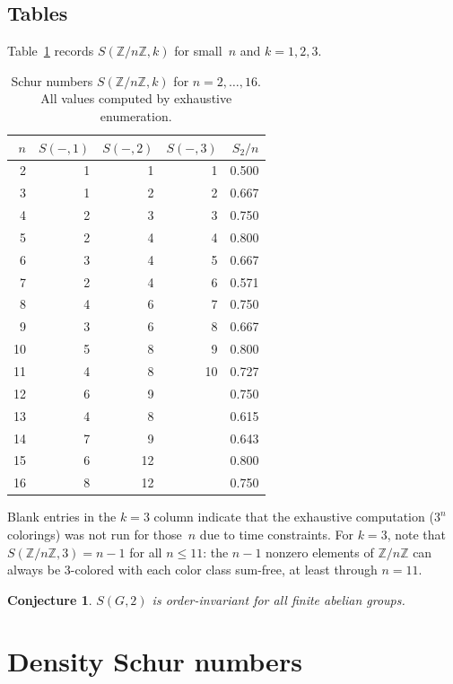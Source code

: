 \documentclass[11pt]{article}
\theoremstyle{plain}
\newtheorem{conjecture}[theorem]{Conjecture}
\theoremstyle{definition}
\newcommand{\ZZ}{\mathbb{Z}}
\begin{document}
\subsection{Tables}

Table~\ref{tab:cyclic} records $S(\ZZ/n\ZZ, k)$ for small~$n$ and
$k=1,2,3$.

\begin{table}[ht]
\centering
\caption{Schur numbers $S(\ZZ/n\ZZ,k)$ for $n=2,\ldots,16$.
All values computed by exhaustive enumeration.}\label{tab:cyclic}
\smallskip
\begin{tabular}{@{}r rrr r@{}}
\toprule
$n$ & $S(-,1)$ & $S(-,2)$ & $S(-,3)$ & $S_2/n$ \\
\midrule
 2  &  1 &  1 &  1 & 0.500 \\
 3  &  1 &  2 &  2 & 0.667 \\
 4  &  2 &  3 &  3 & 0.750 \\
 5  &  2 &  4 &  4 & 0.800 \\
 6  &  3 &  4 &  5 & 0.667 \\
 7  &  2 &  4 &  6 & 0.571 \\
 8  &  4 &  6 &  7 & 0.750 \\
 9  &  3 &  6 &  8 & 0.667 \\
10  &  5 &  8 &  9 & 0.800 \\
11  &  4 &  8 & 10 & 0.727 \\
12  &  6 &  9 &    & 0.750 \\
13  &  4 &  8 &    & 0.615 \\
14  &  7 &  9 &    & 0.643 \\
15  &  6 & 12 &    & 0.800 \\
16  &  8 & 12 &    & 0.750 \\
\bottomrule
\end{tabular}
\end{table}

\noindent
Blank entries in the $k=3$ column indicate that the exhaustive
computation ($3^n$ colorings) was not run for those~$n$ due to time
constraints.
For $k=3$, note that $S(\ZZ/n\ZZ,3) = n-1$ for all $n \le 11$:
the $n-1$ nonzero elements of $\ZZ/n\ZZ$ can always be 3-colored
with each color class sum-free, at least through $n=11$.

\begin{conjecture}
$S(G,2)$ is order-invariant for all finite abelian groups.
\end{conjecture}

\section{Density Schur numbers}\label{sec:density}
\end{document}
